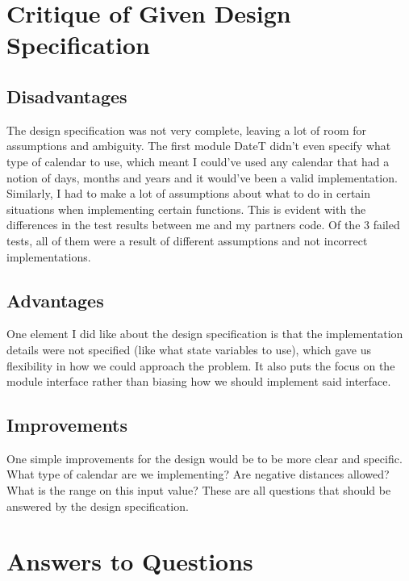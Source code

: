 \documentclass[12pt]{article}
\begin{document}
\section{Critique of Given Design Specification}

\subsection{Disadvantages}
The design specification was not very complete, leaving a lot of room for assumptions and ambiguity. The first module DateT didn't even specify what type of calendar to use, which meant I could've used any calendar that had a notion of days, months and years and it would've been a valid implementation. Similarly, I had to make a lot of assumptions about what to do in certain situations when implementing certain functions. This is evident with the differences in the test results between me and my partners code. Of the 3 failed tests, all of them were a result of different assumptions and not incorrect implementations.

\subsection{Advantages}
One element I did like about the design specification is that the implementation details were not specified (like what state variables to use), which gave us flexibility in how we could approach the problem. It also puts the focus on the module interface rather than biasing how we should implement said interface. 

\subsection{Improvements}
One simple improvements for the design would be to be more clear and specific. What type of calendar are we implementing? Are negative distances allowed? What is the range on this input value? These are all questions that should be answered by the design specification.
\\

\section{Answers to Questions}
\end{document}
